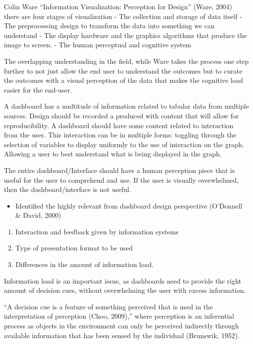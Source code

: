 \documentclass[print]{nuthesis}
\providecommand{\tightlist}{%
  \setlength{\itemsep}{0pt}\setlength{\parskip}{0pt}}
\begin{document}
Colin Ware ``Information Visualization: Perception for Design'' (Ware, 2004) there are four stages of visualization
- The collection and storage of data itself
- The preprocessing design to transform the data into something we can understand
- The display hardware and the graphics algorithms that produce the image to screen.
- The human perceptual and cognitive system

The overlapping understanding in the field, while Ware takes the process one step further to not just allow the end user to understand the outcomes but to curate the outcomes with a visual perception of the data that makes the cognitive load easier for the end-user.

A dashboard has a multitude of information related to tabular data from multiple sources. Design should be recorded a produced with content that will allow for reproducibility. A dashboard should have some content related to interaction from the user. This interaction can be in multiple forms: toggling through the selection of variables to display uniformly to the use of interaction on the graph. Allowing a user to best understand what is being displayed in the graph.

The entire dashboard/Interface should have a human perception piece that is useful for the user to comprehend and use. If the user is visually overwhelmed, then the dashboard/interface is not useful.

\begin{itemize}
\tightlist
\item
  Identified the highly relevant from dashboard design perspective (O'Donnell \& David, 2000)
\end{itemize}

\begin{enumerate}
\def\labelenumi{\arabic{enumi}.}
\tightlist
\item
  Interaction and feedback given by information systems
\item
  Type of presentation format to be used
\item
  Differences in the amount of information load.
\end{enumerate}

Information load is an important issue, as dashboards need to provide the right amount of decision cues, without overwhelming the user with excess information.

``A decision cue is a feature of something perceived that is used in the interpretation of perception (Choo, 2009),'' where perception is an inferential process as objects in the environment can only be perceived indirectly through available information that has been sensed by the individual (Brunswik, 1952).
\end{document}
